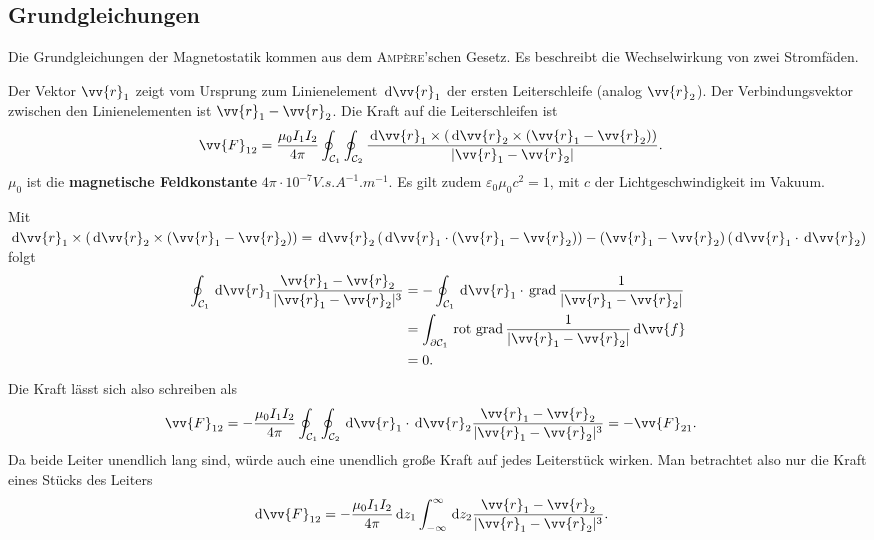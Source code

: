 \documentclass[a4paper,12pt]{article}
\newcommand{\td}{\,\text{d}}
\numberwithin{equation}{section}
\begin{document}
\subsection{Grundgleichungen}
Die Grundgleichungen der Magnetostatik kommen aus dem \textsc{Amp\`ere}'schen Gesetz. Es beschreibt die Wechselwirkung von zwei Stromfäden.\par
Der Vektor $\vv{r}_1$ zeigt vom Ursprung zum Linienelement $\td \vv{r}_1$ der ersten Leiterschleife (analog $\vv{r}_2$). Der Verbindungsvektor zwischen den Linienelementen ist $\vv{r}_1-\vv{r}_2$.
Die Kraft auf die Leiterschleifen ist
\begin{align} 
        \vv{F}_{12}&=\dfrac{\mu _0I_1I_2}{4\pi }\oint_{\mathcal{C}_1}^{}\oint_{\mathcal{C}_2}^{}\dfrac{\td \vv{r}_1\times \left(\td \vv{r}_2\times \left(\vv{r}_1-\vv{r}_2\right)\right)}{|\vv{r}_1-\vv{r}_2|}
.\end{align} 
$\mu _0$ ist die \textbf{magnetische Feldkonstante} $4\pi \cdot 10^{-7}\unit{V.s.A^{-1}.m^{-1}}$.
Es gilt zudem $\varepsilon _0\mu _0c^2=1$, mit $c$ der Lichtgeschwindigkeit im Vakuum.\par
Mit $\td \vv{r}_1\times \left(\td \vv{r}_2\times \left(\vv{r}_1-\vv{r}_2\right)\right)=\td \vv{r}_2\left(\td \vv{r}_1\cdot \left(\vv{r}_1-\vv{r}_2\right)\right)-\left(\vv{r}_1-\vv{r}_2\right)\left(\td \vv{r}_1\cdot \td \vv{r}_2\right)$ folgt
\begin{align} 
        \oint_{\mathcal{C}_1}^{}\td \vv{r}_1\dfrac{\vv{r}_1-\vv{r}_2}{|\vv{r}_1-\vv{r}_2|^3}&=-\oint_{\mathcal{C}_1}^{}\td \vv{r}_1\cdot \,\text{grad}\,\dfrac{1}{|\vv{r}_1-\vv{r}_2|}\\
                                                                                          &=\int_{\partial \mathcal{C}_1}^{}\,\text{rot}\,\,\text{grad}\,\dfrac{1}{|\vv{r}_1-\vv{r}_2|}\td \vv{f}\\
                                                                                          &=0
.\end{align} 
Die Kraft lässt sich also schreiben als
\begin{align} 
        \vv{F}_{12}&=-\dfrac{\mu _0I_1I_2}{4\pi }\oint_{\mathcal{C}_1}^{}\oint_{\mathcal{C}_2}^{}\td \vv{r}_1\cdot \td \vv{r}_2\dfrac{\vv{r}_1-\vv{r}_2}{|\vv{r}_1-\vv{r}_2|^3}=-\vv{F}_{21}
.\end{align} 
Da beide Leiter unendlich lang sind, würde auch eine unendlich große Kraft auf jedes Leiterstück wirken.
Man betrachtet also nur die Kraft eines Stücks des Leiters
\begin{align} 
        \td \vv{F}_{12}&=-\dfrac{\mu _0I_1I_2}{4\pi }\td z_1\int_{-\infty}^{\infty}\td z_2\dfrac{\vv{r}_1-\vv{r}_2}{|\vv{r}_1-\vv{r}_2|^3}
.\end{align} 
\end{document}
